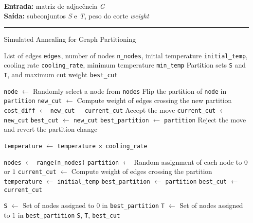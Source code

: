 \documentclass[mirror, portugues]{revdetua}
\begin{document}
\begin{algorithm}[H]
\raggedright
\textbf{Entrada:} matriz de adjacência \textit{G} \\
\textbf{Saída:} subconjuntos \textit{S} e \textit{T}, peso do corte \textit{weight} \\
\hrule 
\caption{Simulated Annealing for Graph Partitioning}
\begin{algorithmic}[1]

    \Require List of edges \texttt{edges}, number of nodes \texttt{n\_nodes}, initial temperature \texttt{initial\_temp}, cooling rate \texttt{cooling\_rate}, minimum temperature \texttt{min\_temp}
    \Ensure Partition sets \texttt{S} and \texttt{T}, and maximum cut weight \texttt{best\_cut}


        \State \texttt{node} $\gets$ Randomly select a node from \texttt{nodes}
        \State Flip the partition of \texttt{node} in \texttt{partition}
        \State \texttt{new\_cut} $\gets$ Compute weight of edges crossing the new partition
        \State \texttt{cost\_diff} $\gets$ \texttt{new\_cut} $-$ \texttt{current\_cut}
            \State Accept the move
            \State \texttt{current\_cut} $\gets$ \texttt{new\_cut}
                \State \texttt{best\_cut} $\gets$ \texttt{new\_cut}
                \State \texttt{best\_partition} $\gets$ \texttt{partition}
            \EndIf
        \Else
            \State Reject the move \\
            \State and revert the partition change
        \EndIf
        
        
        \State \texttt{temperature} $\gets$ \texttt{temperature} \ensuremath{\times} \texttt{cooling\_rate}
    \EndWhile

    \State \texttt{nodes} $\gets$ \texttt{range(n\_nodes)}
    \State \texttt{partition} $\gets$ Random assignment of each node to $0$ or $1$
    \State \texttt{current\_cut} $\gets$ Compute weight of edges crossing the partition
    \State \texttt{temperature} $\gets$ \texttt{initial\_temp}
    \State \texttt{best\_partition} $\gets$ \texttt{partition}
    \State \texttt{best\_cut} $\gets$ \texttt{current\_cut}

    \State \texttt{S} $\gets$ Set of nodes assigned to $0$ in \texttt{best\_partition}
    \State \texttt{T} $\gets$ Set of nodes assigned to $1$ in \texttt{best\_partition}
    \Return \texttt{S}, \texttt{T}, \texttt{best\_cut}
\end{algorithmic}
\end{algorithm}
\end{document}
